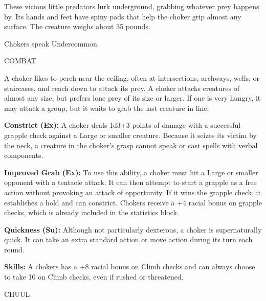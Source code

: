 \documentclass{article}
\begin{document}
These vicious little predators lurk underground, grabbing whatever prey happens 
by. Its hands and feet have spiny pads that help the choker grip almost any surface. 
The creature weighs about 35 pounds.

Chokers speak Undercommon.

COMBAT

A choker likes to perch near the ceiling, often at intersections, archways, wells, 
or staircases, and reach down to attack its prey. A choker attacks creatures of 
almost any size, but prefers lone prey of its size or larger. If one is very hungry, 
it may attack a group, but it waits to grab the last creature in line.

\textbf{Constrict (Ex): }A choker deals 1d3+3 points of damage with a successful 
grapple check against a Large or smaller creature. Because it seizes its victim 
by the neck, a creature in the choker's grasp cannot speak or cast spells with 
verbal components.

\textbf{Improved Grab (Ex): }To use this ability, a choker must hit a Large or 
smaller opponent with a tentacle attack. It can then attempt to start a grapple 
as a free action without provoking an attack of opportunity. If it wins the grapple 
check, it establishes a hold and can constrict. Chokers receive a +4 racial bonus 
on grapple checks, which is already included in the statistics block.

\textbf{Quickness (Su): }Although not particularly dexterous, a choker is supernaturally 
quick. It can take an extra standard action or move action during its turn each 
round.

\textbf{Skills: }A chokers has a +8 racial bonus on Climb checks and can always 
choose to take 10 on Climb checks, even if rushed or threatened.

\vspace{12pt}
{\LARGE{}CHUUL}
\end{document}
